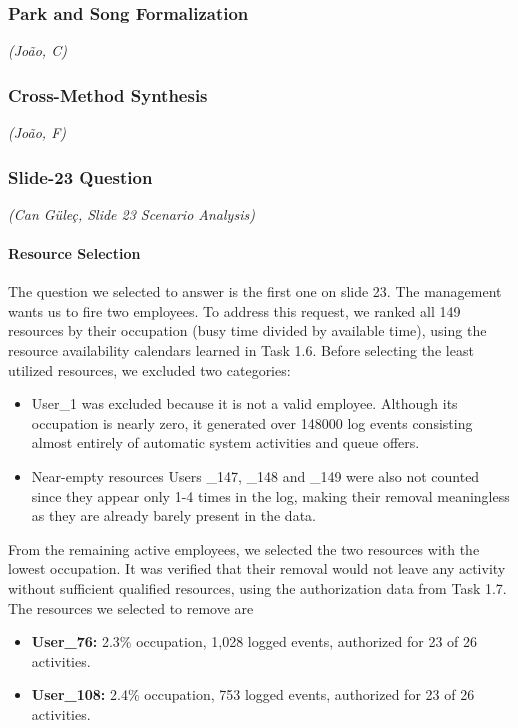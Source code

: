 \documentclass[
  english,
  font=times,
  twocolumn,
]{tumarticle}
\begin{document}
\subsubsection{Park and Song Formalization}
\textit{(João, C)}\quad




\subsubsection{Cross-Method Synthesis}\label{ssub:cross-eval}
\textit{(João, F)}\quad


\subsubsection{Slide-23 Question}
\textit{(Can Güleç, Slide 23 Scenario Analysis)}\quad

\paragraph{Resource Selection}
The question we selected to answer is the first one on slide 23. The management wants us to fire two employees. To address this request, we ranked all 149 resources by their occupation (busy time divided by available time), using the resource availability calendars learned in Task 1.6. Before selecting the least utilized resources, we excluded two categories:
\begin{itemize}
    \item {User\_1} was excluded because it is not a valid employee. Although its occupation is nearly zero, it generated over 148000 log events consisting almost entirely of automatic system activities and queue offers.
    \item {Near-empty resources} Users \_147, \_148 and \_149 were also not counted since they appear only 1-4 times in the log, making their removal meaningless as they are already barely present in the data.
\end{itemize}

From the remaining active employees, we selected the two resources with the lowest occupation. It was verified that their removal would not leave any activity without sufficient qualified resources, using the authorization data from Task 1.7.
The resources we selected to remove are
\begin{itemize}
    \item \textbf{User\_76:} 2.3\% occupation, 1{,}028 logged events, authorized for
    23 of 26 activities.
    \item \textbf{User\_108:} 2.4\% occupation, 753 logged events, authorized for
    23 of 26 activities.
\end{itemize}
\end{document}
